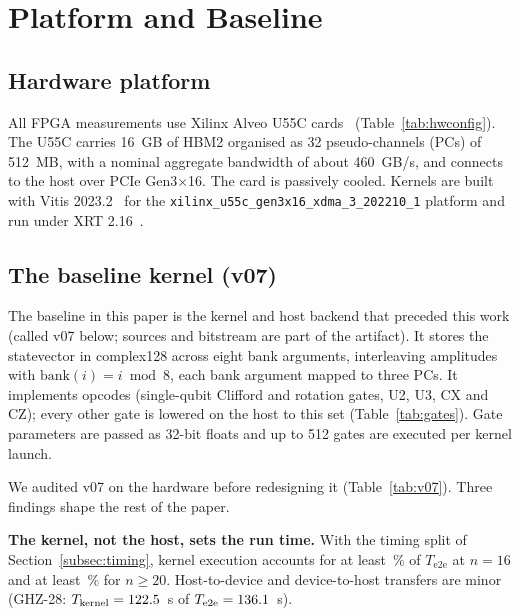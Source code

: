 \section{Platform and Baseline}\label{sec:baseline}

\subsection{Hardware platform}\label{subsec:platform}

All FPGA measurements use Xilinx Alveo U55C cards~\cite{xilinx2023alveo} (Table~\ref{tab:hwconfig}). The U55C carries 16~GB of HBM2 organised as 32 pseudo-channels (PCs) of 512~MB, with a nominal aggregate bandwidth of about 460~GB/s, and connects to the host over PCIe Gen3$\times$16. The card is passively cooled. Kernels are built with Vitis 2023.2~\cite{vitis2023hls} for the \texttt{xilinx\_u55c\_gen3x16\_xdma\_3\_202210\_1} platform and run under XRT 2.16~\cite{xrt2023}.

\subsection{The baseline kernel (v07)}\label{subsec:v07}

The baseline in this paper is the kernel and host backend that preceded this work (called v07 below; sources and bitstream are part of the artifact). It stores the statevector in complex128 across eight bank arguments, interleaving amplitudes with $\text{bank}(i) = i \bmod 8$, each bank argument mapped to three PCs. It implements \NumVsevenOpcodes{} opcodes (single-qubit Clifford and rotation gates, U2, U3, CX and CZ); every other gate is lowered on the host to this set (Table~\ref{tab:gates}). Gate parameters are passed as 32-bit floats and up to 512 gates are executed per kernel launch.

We audited v07 on the hardware before redesigning it (Table~\ref{tab:v07}). Three findings shape the rest of the paper.

\textbf{The kernel, not the host, sets the run time.} With the timing split of Section~\ref{subsec:timing}, kernel execution accounts for at least \NumVsevenKernelFracMin\,\% of $T_\mathrm{e2e}$ at $n=16$ and at least \NumVsevenKernelFracMinTwenty\,\% for $n\geq 20$. Host-to-device and device-to-host transfers are minor (GHZ-28: $T_\mathrm{kernel}=122.5$~s of $T_\mathrm{e2e}=136.1$~s).

